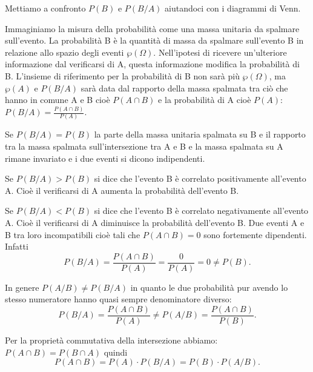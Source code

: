 Mettiamo a confronto $P(B)$ e $P(B/A)$ aiutandoci con i diagrammi di Venn.
\begin{center}
 
\end{center}
Immaginiamo la misura della probabilità come una massa unitaria da spalmare 
sull'evento. La probabilità B è la quantità di massa da spalmare sull'evento B 
in relazione allo spazio degli eventi $\wp (\Omega )$. Nell'ipotesi di ricevere 
un'ulteriore informazione dal verificarsi di A, questa informazione modifica la 
probabilità di B. L'insieme di riferimento per la probabilità di B non sarà più 
$\wp (\Omega )$, ma $\wp (A)$ e $P(B/A)$ sarà data dal rapporto della massa 
spalmata tra ciò che hanno in comune A e B cioè $P(A\cap B)$ e la probabilità 
di 
A cioè $P(A)$: $P(B/A)=\frac{P(A\cap B)}{P(A)}$.

Se $P(B/A)=P(B)$ la parte della massa unitaria spalmata su B e il rapporto tra 
la massa spalmata sull'intersezione tra A e B e la massa spalmata su A rimane 
invariato e i due eventi si dicono indipendenti.

Se $P(B/A)>P(B)$ si dice che l'evento B è correlato positivamente all'evento A. 
Cioè il verificarsi di A aumenta la probabilità dell'evento B.

Se $P(B/A)<P(B)$ si dice che l'evento B è correlato negativamente all'evento A. 
Cioè il verificarsi di A diminuisce la probabilità dell'evento B.
\osservazione Due eventi A e B tra loro incompatibili cioè tali che $P(A\cap 
B)=0$ sono fortemente dipendenti. Infatti 
\[P(B/A)=\frac{P(A\cap B)}{P(A)}=\frac 0{P(A)}=0\neq P(B).\]

In genere $ P(A/B)\neq P(B/A) $ in quanto le due probabilità pur avendo lo 
stesso numeratore hanno quasi sempre denominatore diverso: 
\[P(B/A)=\frac{P(A\cap B)}{P(A)}\neq P(A/B)=\frac{P(A\cap B)}{P(B)}.\]

Per la proprietà commutativa della intersezione abbiamo: $P(A\cap B)=P(B\cap 
A)$ 
quindi 
\[P(A\cap B)=P(A)\cdot P(B/A)=P(B)\cdot P(A/B).\]

